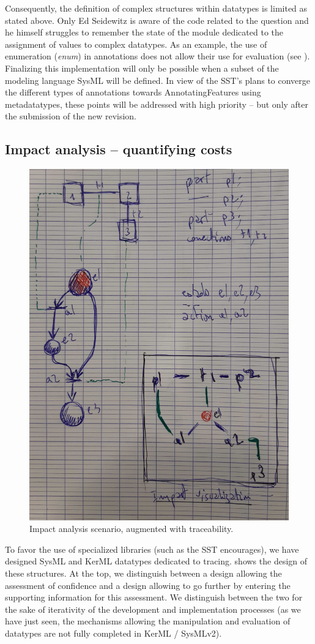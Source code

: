 Consequently, the definition of complex structures within datatypes is limited as stated above. Only Ed Seidewitz is aware of the code related to the question and he himself struggles to remember the state of the module dedicated to the assignment of values to complex datatypes. As an example, the use of enumeration (\textit{enum}) in annotations does not allow their use for evaluation (see ). 
Finalizing this implementation will only be possible when a subset of the modeling language SysML will be defined. In view of the SST's plans to converge the different types of annotations towards AnnotatingFeatures using metadatatypes, these points will be addressed with high priority -- but only after the submission of the new revision.

\subsection{Impact analysis -- quantifying costs}\label{sec:impact}
\begin{figure}[ht]      
	\centering 
	\includegraphics[width=.5\linewidth]{images/scenario-impacto.jpg}
	\caption{Impact analysis scenario, augmented with traceability.}
	\label{fig:impact}
\end{figure}

To favor the use of specialized libraries (such as the SST encourages), we have designed SysML and KerML datatypes dedicated to tracing. 
 shows the design of these structures. At the top, we distinguish between a design allowing the assessment of confidence and a design allowing to go further by entering the supporting information for this assessment.
We distinguish between the two for the sake of iterativity of the development and implementation processes (as we have just seen, the mechanisms allowing the manipulation and evaluation of datatypes are not fully completed in KerML / SysMLv2).

